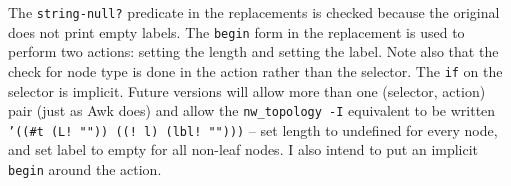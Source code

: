 The {\tt string-null?} predicate in the  replacements is checked
because the original  does not print empty labels. The {\tt begin} form
in the \topology{} replacement is used to perform two actions: setting the
length and setting the label. Note also that the check for node type is done in
the action rather than the selector. The {\tt if} on the selector is implicit.
Future versions will allow more than one (selector, action) pair (just as Awk
does) and allow the {\tt nw\_topology -I} equivalent to be written {\tt '((\#t
(L! "")) ((! l) (lbl! "")))} -- set length to undefined for every node, and set
label to empty for all non-leaf nodes. I also intend to put an implicit {\tt
begin} around the action.
